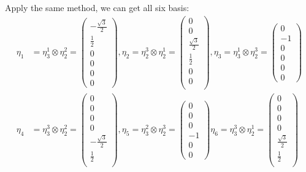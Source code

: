 \documentclass[]{ctexart}
\begin{document}
Apply the same method, we can get all six basis:
	\begin{equation*}
	\begin{aligned}
		\eta_1&=\eta_3^1\otimes \eta_2^2=
		\begin{pmatrix}
			-\frac{\sqrt{3}}{2}\\
			\frac{1}{2}\\
			0\\
			0\\
			0\\
			0
		\end{pmatrix},
		\eta_2=\eta_2^3\otimes \eta_2^1=
		\begin{pmatrix}
		0\\
		0\\
		\frac{\sqrt{3}}{2}\\
		\frac{1}{2}\\
		0\\
		0\\
		\end{pmatrix},
		\eta_3=\eta_3^1\otimes \eta_2^3=
		\begin{pmatrix}
		0\\
		-1\\
		0\\
		0\\
		0\\
		0
		\end{pmatrix}\\
		\eta_4&=\eta_3^3\otimes \eta_2^2=
		\begin{pmatrix}
			0\\
			0\\
			0\\
			0\\
			-\frac{\sqrt{3}}{2}\\
			\frac{1}{2}\\
		\end{pmatrix},
		\eta_5=\eta_3^2\otimes \eta_2^3=
		\begin{pmatrix}
		0\\
		0\\
		0\\
		-1\\
		0\\
		0
		\end{pmatrix}
		\eta_6=\eta_3^3\otimes \eta_2^1=
		\begin{pmatrix}
		0\\
		0\\
		0\\
		0\\
		\frac{\sqrt{3}}{2}\\
		\frac{1}{2}\\
		\end{pmatrix}
	\end{aligned}
	\end{equation*}
	
\end{document}
